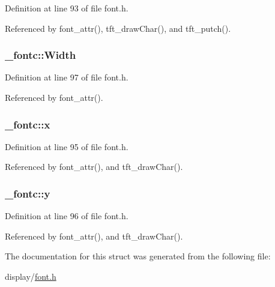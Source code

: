Definition at line 93 of file font.\-h.



Referenced by font\-\_\-attr(), tft\-\_\-draw\-Char(), and tft\-\_\-putch().

\hypertarget{struct__fontc_ae3c802e1c35ae9a4e37c8eb2e9644325}{
\subsubsection[{Width}]{ \-\_\-fontc\-::\-Width}}\label{struct__fontc_ae3c802e1c35ae9a4e37c8eb2e9644325}


Definition at line 97 of file font.\-h.



Referenced by font\-\_\-attr().

\hypertarget{struct__fontc_ad15d00ed46ebe52a085cf05b5ca5da90}{
\subsubsection[{x}]{ \-\_\-fontc\-::x}}\label{struct__fontc_ad15d00ed46ebe52a085cf05b5ca5da90}


Definition at line 95 of file font.\-h.



Referenced by font\-\_\-attr(), and tft\-\_\-draw\-Char().

\hypertarget{struct__fontc_aebbde0dc41068722ee1a69f4a56478a4}{
\subsubsection[{y}]{ \-\_\-fontc\-::y}}\label{struct__fontc_aebbde0dc41068722ee1a69f4a56478a4}


Definition at line 96 of file font.\-h.



Referenced by font\-\_\-attr(), and tft\-\_\-draw\-Char().



The documentation for this struct was generated from the following file\-:\begin{DoxyCompactItemize}
\item 
display/\hyperlink{display_2font_8h}{font.\-h}\end{DoxyCompactItemize}
